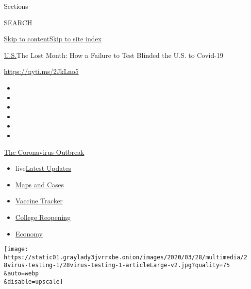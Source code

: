 Sections

SEARCH

\protect\hyperlink{site-content}{Skip to
content}\protect\hyperlink{site-index}{Skip to site index}

\href{/section/us}{U.S.}\textbar{}The Lost Month: How a Failure to Test
Blinded the U.S. to Covid-19

\url{https://nyti.ms/2JkLno5}

\begin{itemize}
\item
\item
\item
\item
\item
\item
\end{itemize}

\href{https://www.nytimes3xbfgragh.onion/news-event/coronavirus?action=click\&pgtype=Article\&state=default\&region=TOP_BANNER\&context=storylines_menu}{The
Coronavirus Outbreak}

\begin{itemize}
\tightlist
\item
  live\href{https://www.nytimes3xbfgragh.onion/2020/08/03/world/coronavirus-covid-19.html?action=click\&pgtype=Article\&state=default\&region=TOP_BANNER\&context=storylines_menu}{Latest
  Updates}
\item
  \href{https://www.nytimes3xbfgragh.onion/interactive/2020/us/coronavirus-us-cases.html?action=click\&pgtype=Article\&state=default\&region=TOP_BANNER\&context=storylines_menu}{Maps
  and Cases}
\item
  \href{https://www.nytimes3xbfgragh.onion/interactive/2020/science/coronavirus-vaccine-tracker.html?action=click\&pgtype=Article\&state=default\&region=TOP_BANNER\&context=storylines_menu}{Vaccine
  Tracker}
\item
  \href{https://www.nytimes3xbfgragh.onion/2020/08/02/us/covid-college-reopening.html?action=click\&pgtype=Article\&state=default\&region=TOP_BANNER\&context=storylines_menu}{College
  Reopening}
\item
  \href{https://www.nytimes3xbfgragh.onion/live/2020/08/03/business/stock-market-today-coronavirus?action=click\&pgtype=Article\&state=default\&region=TOP_BANNER\&context=storylines_menu}{Economy}
\end{itemize}

\texttt{[image: https://static01.graylady3jvrrxbe.onion/images/2020/03/28/multimedia/28virus-testing-1/28virus-testing-1-articleLarge-v2.jpg?quality=75\\\&auto=webp\\\&disable=upscale]}

